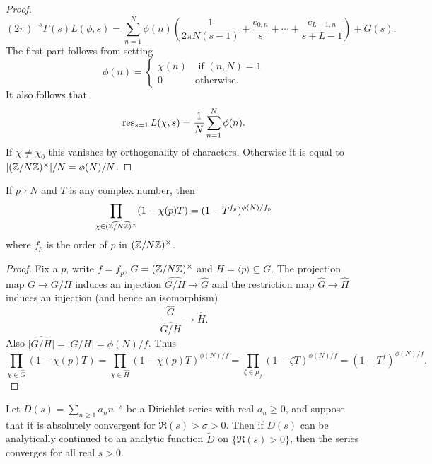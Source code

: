 \documentclass{memoir}
\begin{document}
\begin{proof}
\begin{equation}
        (2\pi)^{-s}\Gamma(s)L(\phi,s) = \sum_{n=1}^N\phi(n)\left(\frac1{2\pi N(s-1)}+\frac{c_{0,n}}s+\cdots+\frac{c_{L-1,n}}{s+L-1}\right) + G(s).
    \end{equation}
    The first part follows from setting 
    \begin{equation}
        \phi(n) = \begin{cases}
            \chi(n) & \text{ if $(n,N)=1$} \\
            0 & \text{otherwise.}
        \end{cases}
    \end{equation}
    It also follows that
    \begin{equation}
        \operatorname{res}_{s=1}L(\chi,s) = \frac1N\sum_{n=1}^N\phi(n).
    \end{equation}
    If $\chi\ne\chi_0$ this vanishes by orthogonality of characters.
    Otherwise it is equal to $\lvert(\mathbb{Z}/N\mathbb{Z})^\times\rvert/N = \phi(N)/N$.
\end{proof}
\begin{lemma}
    \label{lem:ord}
    If $p\nmid N$ and $T$ is any complex number, then 
    \begin{equation}
        \prod_{\chi\in \widehat{(\mathbb{Z}/N\mathbb{Z})^\times}}(1-\chi(p)T) = (1-T^{f_p})^{\phi(N)/f_p}
    \end{equation}
    where $f_p$ is the order of $p$ in $(\mathbb{Z}/N\mathbb{Z})^\times$.
\end{lemma}
\begin{proof}
    Fix a $p$, write $f = f_p$, $G = (\mathbb{Z}/N\mathbb{Z})^\times$ and $H = \langle p \rangle \subseteq G$.
    The projection map $G\to G/H$ induces an injection $\widehat{G/H} \to \hat G$ and the restriction map $\hat G \to \hat H$ induces an injection (and hence an isomorphism)
    \begin{equation}
        \frac{\hat G}{\widehat{G/H}} \to \hat H.
    \end{equation}
    Also $\widehat{|G/H|} = |G/H| = \phi(N)/f$.
    Thus
    \begin{equation}
        \prod_{\chi \in \hat G}(1-\chi(p)T) = \prod_{\chi \in \hat H}(1-\chi(p)T)^{\phi(N)/f} = \prod_{\zeta\in \mu_f}(1-\zeta T)^{\phi(N)/f} = (1-T^f)^{\phi(N)/f}.
    \end{equation}
\end{proof}
\begin{lemma}
    \label{lem:conv}
    Let $D(s) = \sum_{n\ge 1}a_n n^{-s}$ be a Dirichlet series with real $a_n\ge 0$, and suppose that it is absolutely convergent for $\Re(s) > \sigma > 0$.
    Then if $D(s)$ can be analytically continued to an analytic function $\tilde D$ on $\{\Re(s)>0\}$, then the series converges for all real $s>0$.
\end{lemma}
\end{document}
